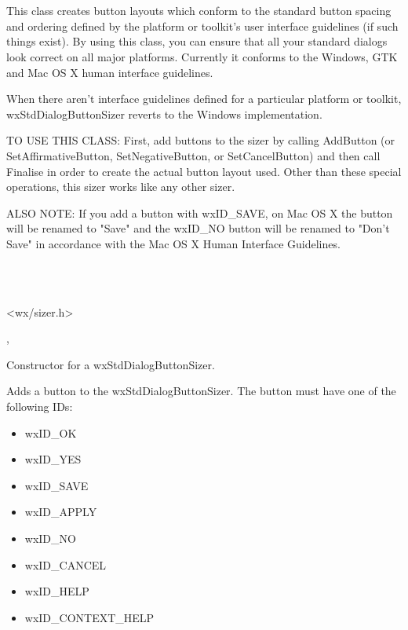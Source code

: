 \section{}\label{wxstddialogbuttonsizer}

This class creates button layouts which conform to the standard button spacing and ordering defined by the platform or toolkit's user interface guidelines (if such things exist). By using this class, you can ensure that all your standard dialogs look correct on all major platforms. Currently it conforms to the Windows, GTK and Mac OS X human interface guidelines.

When there aren't interface guidelines defined for a particular platform or toolkit, wxStdDialogButtonSizer reverts to the Windows implementation. 

TO USE THIS CLASS: First, add buttons to the sizer by calling AddButton (or SetAffirmativeButton, SetNegativeButton, or SetCancelButton) and then call Finalise in order to create the actual button layout used. Other than these special operations, this sizer works like any other sizer. 

ALSO NOTE: If you add a button with wxID_SAVE, on Mac OS X the button will be renamed to "Save" and the wxID_NO button will be renamed to "Don't Save" in accordance with the Mac OS X Human Interface Guidelines.


\\
\\


<wx/sizer.h>


, 


Constructor for a wxStdDialogButtonSizer.

\label{wxstddialogbuttonsizeraddbutton}


Adds a button to the wxStdDialogButtonSizer. The button must have one of the following IDs:

\begin{itemize}
	\item wxID_OK
	\item wxID_YES
	\item wxID_SAVE
	\item wxID_APPLY
	\item wxID_NO
	\item wxID_CANCEL
	\item wxID_HELP
	\item wxID_CONTEXT_HELP
\end{itemize}

